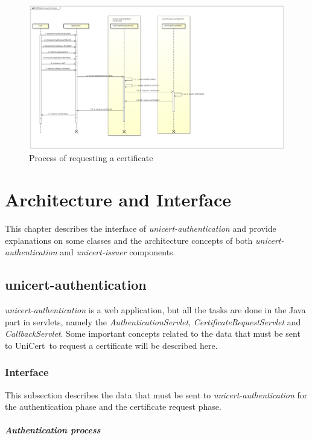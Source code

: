 \documentclass[oneside]{scrreprt}
\newcommand{\unicert}{\mbox{UniCert}}
\begin{document}
\begin{figure}[ht]
\centerline{
\includegraphics[width=1.0\textwidth]{figs/certificate_request_process2}}
\caption{Process of requesting a certificate}
\label{fig:request_process}
\end{figure}

\chapter{Architecture and Interface} \label{chap:architecture}
This chapter describes the interface of \textit{unicert-authentication} and provide explanations on some classes and the architecture concepts of both \textit{unicert-authentication} and \textit{unicert-issuer} components.

\section{unicert-authentication}

\textit{unicert-authentication} is a web application, but all the tasks are done in the Java part in servlets, namely the \textit{AuthenticationServlet}, \textit{CertificateRequestServlet} and \textit{CallbackServlet}. Some important concepts related to the data that must be sent to \unicert\ to request a certificate will be described here.

\subsection{Interface}

This subsection describes the data that must be sent to \textit{unicert-authentication} for the authentication phase and the certificate request phase.

\paragraph*{Authentication process}
\end{document}

